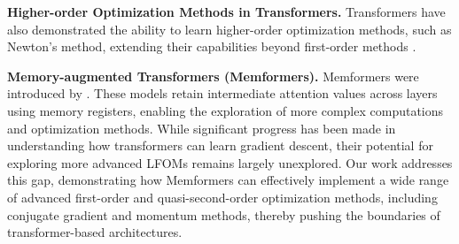 \textbf{Higher-order Optimization Methods in Transformers.} Transformers have also demonstrated the ability to learn higher-order optimization methods, such as Newton's method, extending their capabilities beyond first-order methods \cite{fu2023transformerslearnachievesecondorder, giannou2024transformersemulateincontextnewtons, vladymyrov2024lineartransformersversatileincontext}.

\textbf{Memory-augmented Transformers (Memformers).} Memformers were introduced by \cite{wu2022memformermemoryaugmentedtransformersequence, Xu_Liang_Cheng_Wei_Chen_Zhang_2021, dutta2024memoryaugmentedtransformersimplementlinear}. These models retain intermediate attention values across layers using memory registers, enabling the exploration of more complex computations and optimization methods. While significant progress has been made in understanding how transformers can learn gradient descent, their potential for exploring more advanced LFOMs remains largely unexplored. Our work addresses this gap, demonstrating how Memformers can effectively implement a wide range of advanced first-order and quasi-second-order optimization methods, including conjugate gradient and momentum methods, thereby pushing the boundaries of transformer-based architectures.
